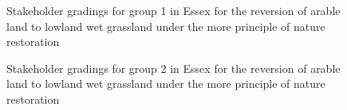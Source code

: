 \documentclass[
  12pt,
  letterpaper,
  DIV=11,
  numbers=noendperiod]{scrartcl}
\begin{document}
\begin{figure}[H]


\caption{\label{fig-EsArMoreG1}Stakeholder gradings for group 1 in Essex
for the reversion of arable land to lowland wet grassland under the more
principle of nature restoration}

\end{figure}%

\begin{figure}[H]


\caption{\label{fig-EsArMoreG2}Stakeholder gradings for group 2 in Essex
for the reversion of arable land to lowland wet grassland under the more
principle of nature restoration}

\end{figure}%
\end{document}
